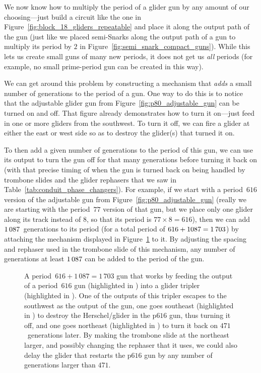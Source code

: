 We now know how to multiply the period of a glider gun by any amount of our choosing---just build a circuit like the one in Figure~\ref{fig:block_18_gliders_repeatable} and place it along the output path of the gun (just like we placed semi-Snarks along the output path of a gun to multiply its period by $2$ in Figure~\ref{fig:semi_snark_compact_guns}). While this lets us create small guns of many new periods, it does not get us \emph{all} periods (for example, no small prime-period gun can be created in this way).

We can get around this problem by constructing a mechanism that \emph{adds} a small number of generations to the period of a gun. One way to do this is to notice that the adjustable glider gun from Figure~\ref{fig:p80_adjustable_gun} can be turned on and off. That figure already demonstrates how to turn it on---just feed in one or more gliders from the southwest. To turn it off, we can fire a glider at either the east or west side so as to destroy the glider(s) that turned it on.

To then add a given number of generations to the period of this gun, we can use its output to turn the gun off for that many generations before turning it back on (with that precise timing of when the gun is turned back on being handled by trombone slides and the glider rephasers that we saw in Table~\ref{tab:conduit_phase_changers}). For example, if we start with a period~$616$ version of the adjustable gun from Figure~\ref{fig:p80_adjustable_gun} (really we are starting with the period~$77$ version of that gun, but we place only one glider along its track instead of $8$, so that its period is $77 \times 8 = 616$), then we can add $1{\,}087$~generations to its period (for a total period of $616+1087 = 1{\,}703$) by attaching the mechanism displayed in Figure~\ref{fig:p1703_gun} to it. By adjusting the spacing and rephaser used in the trombone slide of this mechanism, any number of generations at least $1{\,}087$ can be added to the period of the gun.

\begin{figure}[!htb]
	\centering
	\caption{A period~$616+1\, 087 = 1\, 703$ gun that works by feeding the output of a period~$616$ gun (highlighted in ) into a glider tripler (highlighted in ). One of the outputs of this tripler escapes to the southwest as the output of the gun, one goes southeast (highlighted in ) to destroy the Herschel/glider in the p$616$ gun, thus turning it off, and one goes northeast (highlighted in ) to turn it back on $471$~generations later. By making the trombone slide at the northeast larger, and possibly changing the rephaser that it uses, we could also delay the glider that restarts the p$616$ gun by any number of generations larger than $471$.}
	\label{fig:p1703_gun}
\end{figure}


